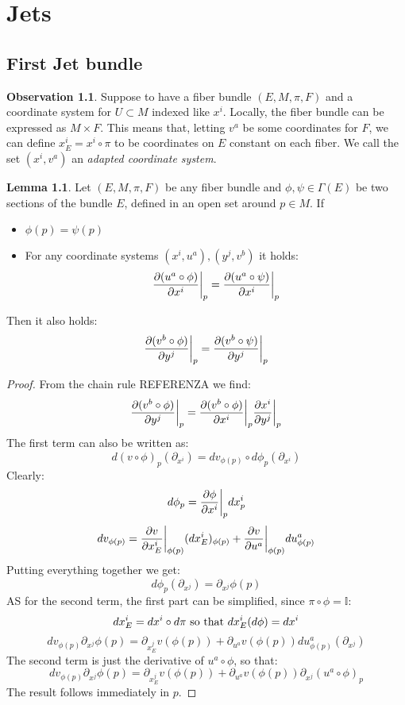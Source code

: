 \documentclass[12pt,a4paper]{report}
\theoremstyle{definition}
\theoremstyle{Theorem}
\newtheorem{Lm}[Def]{Lemma}
\theoremstyle{definition}
\theoremstyle{definition}
\newtheorem{Obs}[Def]{Observation}
\begin{document}
	\chapter{Jets}
	\section{First Jet bundle}
	\begin{Obs}
		Suppose to have a fiber bundle $(E,M,\pi,F)$ and a coordinate system for $U\subset M$ indexed like $x^i$. Locally, the fiber bundle can be expressed as $M\times F$. This means that, letting $v^a$ be some coordinates for $F$, we can define $x_E^i=x^i \circ \pi$ to be coordinates on $E$ constant on each fiber. We call the set $(x^i,v^a)$ an \textit{adapted coordinate system}.
	\end{Obs}
	\begin{Lm}
		Let $(E,M,\pi,F)$ be any fiber bundle and $\phi,\psi\in\Gamma(E)$ be two sections of the bundle $E$, defined in an open set around $p\in M$. If
		\begin{itemize}
			\item $\phi(p)=\psi(p)$ 
			\item For any coordinate systems $(x^i,u^a),(y^j,v^b)$ it holds:
			$${\partial(u^a\circ\phi) \over \partial{x^i}}\bigg|_p={\partial(u^a\circ\psi) \over \partial{x^i}}\bigg|_p$$
		\end{itemize} 
		Then it also holds:
		$${\partial(v^b\circ\phi) \over \partial{y^j}}\bigg|_p={\partial(v^b\circ\psi) \over \partial{y^j}}\bigg|_p$$
	\end{Lm}
	\begin{proof}
		From the chain rule REFERENZA we find:
		$${\partial(v^b\circ\phi) \over \partial{y^j}}\bigg|_p={\partial(v^b\circ\phi) \over \partial{x^i}}\bigg|_p{\partial x^i \over \partial{y^j}}\bigg|_p$$
		The first term can also be written as:
		$$d(v\circ \phi)_p(\partial_{x^i})=dv_{\phi(p)}\circ d\phi_p(\partial_{x^i})$$
		Clearly:
		$$d\phi_p={\partial \phi\over \partial{x^i}}\bigg|_p dx^i_p$$
		$$dv_{\phi(p)}={\partial v\over  \partial{x^i_E}}\bigg|_{\phi(p)} (dx^i_E)_{\phi(p)}+{\partial v\over \partial u^a}\bigg|_{\phi(p)} du^a_{\phi(p)}$$
		Putting everything together we get:
		$$d\phi_p(\partial_{x^j})=\partial_{x^j}\phi(p)$$
		AS for the second term, the first part can be simplified, since $\pi\circ \phi=\mathbb{I}$:
		$$dx^i_E=dx^i\circ d\pi\hbox{ so that }dx^i_E(d\phi)=dx^i$$
		$$dv_{\phi(p)}\partial_{x^j}\phi(p)=\partial_{x^j_E}v(\phi(p))+\partial_{u^a}v(\phi(p)) du^a_{\phi(p)}(\partial_{x^j})$$
		The second term is just the derivative of $u^a\circ \phi$, so that:
		$$dv_{\phi(p)}\partial_{x^j}\phi(p)=\partial_{x^j_E}v(\phi(p))+\partial_{u^a}v(\phi(p)) \partial_{x^j}(u^a\circ \phi)_p$$
		The result follows immediately in $p$.
	\end{proof}
\end{document}
